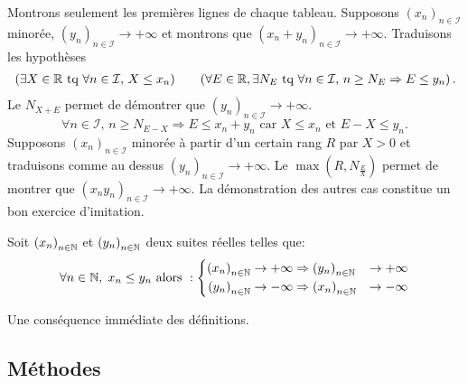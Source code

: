 \begin{demo}
  Montrons seulement les premières lignes de chaque tableau.\newline
Supposons $\left(x_n \right)_{n\in\mathcal I}$ minorée, $\left(y_n \right)_{n\in\mathcal I} \rightarrow +\infty$ et montrons que $\left(x_n + y_n \right)_{n\in\mathcal I} \rightarrow +\infty$. Traduisons les hypothèses
\[
  \begin{aligned}
    &\left(\exists X \in \mathbb{R} \text{ tq } \forall n \in \mathcal{I},\, X \leq x_n\right) 
    & &
    &\left(\forall E \in \mathbb{R}, \exists N_E \text{ tq } \forall n \in \mathcal{I},\, n \geq N_E \Rightarrow E \leq y_n \right).
  \end{aligned}
\]
Le $N_{X + E}$ permet de démontrer que $\left(y_n \right)_{n\in\mathcal I} \rightarrow +\infty$.
\[
  \forall n \in \mathcal{I},\, n \geq N_{E -X} \Rightarrow E \leq x_n + y_n \text{ car } X \leq x_n \text{ et }  E - X \leq y_n .
\]
Supposons $\left(x_n \right)_{n\in\mathcal I}$ minorée à partir d'un certain rang $R$ par $X>0$ et traduisons comme au dessus $\left(y_n \right)_{n\in\mathcal I} \rightarrow +\infty$.\newline
Le $\max(R, N_{\frac{E}{X}})$ permet de montrer que $\left(x_n  y_n \right)_{n\in\mathcal I} \rightarrow +\infty$.\newline
La démonstration des autres cas constitue un bon exercice d'imitation.
\end{demo}

\begin{thm}
  Soit $\left( x_n\right)_{n\in \mathbb{N}}$ et $\left( y_n\right)_{n\in \mathbb{N}}$ deux suites réelles telles que:
\begin{displaymath}
\forall n\in \mathbb{N},\; x_n \leq y_n\text{ alors }:
\left\lbrace 
\begin{aligned}
  \left( x_n\right)_{n\in \mathbb{N}}&\rightarrow + \infty \Rightarrow \left( y_n\right)_{n\in \mathbb{N}}&\rightarrow + \infty \\
  \left( y_n\right)_{n\in \mathbb{N}}&\rightarrow - \infty \Rightarrow \left( x_n\right)_{n\in \mathbb{N}}&\rightarrow - \infty 
\end{aligned}
\right. 
\end{displaymath}
\end{thm}
\begin{demo}
  Une conséquence immédiate des définitions.
\end{demo}

\subsection{Méthodes}
